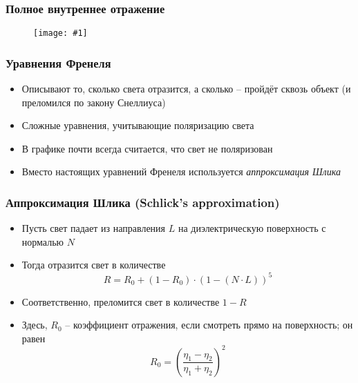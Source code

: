 \documentclass[10pt,handout]{beamer}
\newcommand{\slideimage}[1]{
  \begin{figure}
    \begin{adjustbox}{width=\textwidth, totalheight=\textheight-2\baselineskip-2\baselineskip,keepaspectratio}
      \texttt{[image: \#1]}
    \end{adjustbox}
  \end{figure}
}
\begin{document}
\begin{frame}[fragile]
\frametitle{Полное внутреннее отражение}
\slideimage{turtle.jpg}
\end{frame}

\begin{frame}
\frametitle{Уравнения Френеля}
\begin{itemize}
\item Описывают то, сколько света отразится, а сколько -- пройдёт сквозь объект (и преломился по закону Снеллиуса)
\pause
\item Сложные уравнения, учитывающие поляризацию света
\pause
\item В графике почти всегда считается, что свет не поляризован
\pause
\item Вместо настоящих уравнений Френеля используется \textit{аппроксимация Шлика}
\end{itemize}
\end{frame}

\begin{frame}
\frametitle{Аппроксимация Шлика (Schlick's approximation)}
\begin{itemize}
\item Пусть свет падает из направления \begin{math}L\end{math} на диэлектрическую поверхность с нормалью \begin{math}N\end{math}
\pause
\item Тогда отразится свет в количестве
\begin{equation*}
R = R_0 + (1 - R_0) \cdot (1 - (N \cdot L))^5
\end{equation*}
\pause
\item Соответственно, преломится свет в количестве \begin{math}1-R\end{math}
\pause
\item Здесь, \begin{math}R_0\end{math} -- коэффициент отражения, если смотреть прямо на поверхность; он равен
\begin{equation*}
R_0 = \left(\frac{\eta_1-\eta_2}{\eta_1+\eta_2}\right)^2
\end{equation*}
\end{itemize}
\end{frame}
\end{document}
